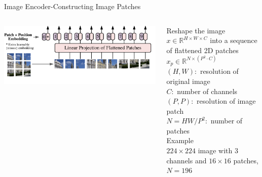 \documentclass[aspectratio=169,xcolor=dvipsnames]{beamer}
\begin{document}

\begin{frame}{Image Encoder-Constructing Image Patches}

\begin{columns}
    \begin{column}{0.5\textwidth}
    \includegraphics[width=\textwidth]{figures/patches_vision_transformer.png}
    \end{column}

    \begin{column}{0.5\textwidth}
    Reshape the image $x \in \mathbb{R}^{H\times W \times C}$ into a sequence of flattened 2D patches $x_p \in \mathbb{R}^{N\times (P^2\cdot C)}$\\
    \smallskip
    $(H,W) : $ resolution of original image\\
    $C : $ number of channels\\
    $(P,P) : $ resolution of image patch\\
    $N=HW/P^2 : $ number of patches \\
    \bigskip
    Example\\
    $224\times 224$ image with $3$ channels and $16\times 16$ patches,$N=196$
\end{column}
\end{columns}

\end{frame}


\end{document}
